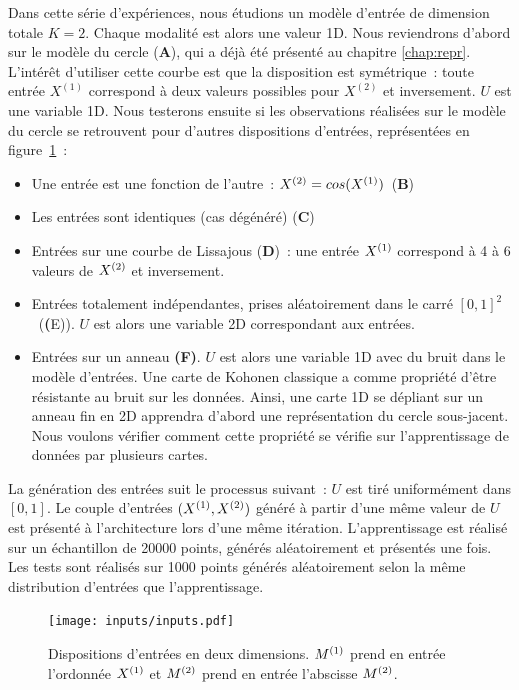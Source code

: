 \documentclass[../main]{subfiles}
\begin{document}
Dans cette série d'expériences, nous étudions un modèle d'entrée de dimension totale $K=2$. Chaque modalité est alors une valeur 1D.
Nous reviendrons d'abord sur le modèle du cercle (\textbf{A}), qui a déjà été présenté au chapitre \ref{chap:repr}. L'intérêt d'utiliser cette courbe est que la disposition est symétrique~: toute entrée $X^{(1)}$ correspond à deux valeurs possibles pour $X^{(2)}$ et inversement. $U$ est une variable 1D.
Nous testerons ensuite si les observations réalisées sur le modèle du cercle se retrouvent pour d'autres dispositions d'entrées, représentées en figure~\ref{fig:input_list}~:
\begin{itemize}
	\item Une entrée est une fonction de l'autre~: $X^{({2})} = cos(X^{({1})})$~(\textbf{B})
	\item Les entrées sont identiques (cas dégénéré) (\textbf{C})
	\item Entrées sur une courbe de Lissajous (\textbf{D})~: une entrée $X^{({1})}$ correspond à 4 à 6 valeurs de $X^{({2})}$ et inversement.
	\item Entrées totalement indépendantes, prises aléatoirement dans le carré $[0,1]^2$~(\textbf({E})). $U$ est alors une variable 2D correspondant aux entrées.
	\item Entrées sur un anneau \textbf{(F)}. $U$ est alors une variable 1D avec du bruit dans le modèle d'entrées. Une carte de Kohonen classique a comme propriété d'être résistante au bruit sur les données. Ainsi, une carte 1D se dépliant sur un anneau fin en 2D apprendra d'abord une représentation du cercle sous-jacent. Nous voulons vérifier comment cette propriété se vérifie sur l'apprentissage de données par plusieurs cartes.
\end{itemize}

La génération des entrées suit le processus suivant~: $U$ est tiré uniformément dans $[0,1]$. Le couple d'entrées $(X^{({1})},X^{({2})})$ généré à partir d'une même valeur de $U$ est présenté à l'architecture lors d'une même itération.
L'apprentissage est réalisé sur un échantillon de 20000 points, générés aléatoirement et présentés une fois. 
Les tests sont réalisés sur 1000 points générés aléatoirement selon la même distribution d'entrées que l'apprentissage.

\begin{figure}[h]
	\texttt{[image: inputs/inputs.pdf]}
	\caption{Dispositions d'entrées en deux dimensions. $M^{({1})}$ prend en entrée l'ordonnée $X^{({1})}$ et $M^{({2})}$ prend en entrée l'abscisse $M^{({2})}$. \label{fig:input_list}}
\end{figure}
\end{document}

